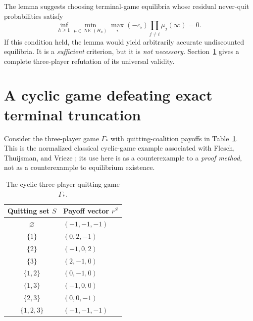 \documentclass[11pt,a4paper]{article}
\numberwithin{equation}{section}
\theoremstyle{plain}
\theoremstyle{definition}
\theoremstyle{remark}
\newcommand{\NE}{\operatorname{NE}}
\begin{document}
The lemma suggests choosing terminal-game equilibria whose residual
never-quit probabilities satisfy
\begin{equation}\label{eq:badcriterion}
 \inf_{h\ge1}\min_{\mu\in\NE(H_h)}
 \max_i(-c_i)\prod_{j\ne i}\mu_j(\infty)=0.
\end{equation}
If this condition held, the lemma would yield arbitrarily accurate
undiscounted equilibria. It is a \emph{sufficient} criterion, but it is
\emph{not necessary}. Section~\ref{sec:counterexample} gives a complete
three-player refutation of its universal validity.

\section{A cyclic game defeating exact terminal truncation}\label{sec:counterexample}
Consider the three-player game $\Gamma_*$ with quitting-coalition
payoffs in Table~\ref{tab:cyclic}. This is the normalized classical
cyclic-game example associated with Flesch, Thuijsman, and Vrieze
\cite{Flesch1997,AKRS2026}; its use here is as a counterexample to a
\emph{proof method}, not as a counterexample to equilibrium existence.
\begin{table}[htbp]
\centering
\caption{The cyclic three-player quitting game $\Gamma_*$.}
\label{tab:cyclic}
\begin{tabular}{@{}cl@{}}\toprule
Quitting set $S$ & Payoff vector $r^S$\\\midrule
$\varnothing$ & $(-1,-1,-1)$\\
$\{1\}$ & $(0,2,-1)$\\
$\{2\}$ & $(-1,0,2)$\\
$\{3\}$ & $(2,-1,0)$\\
$\{1,2\}$ & $(0,-1,0)$\\
$\{1,3\}$ & $(-1,0,0)$\\
$\{2,3\}$ & $(0,0,-1)$\\
$\{1,2,3\}$ & $(-1,-1,-1)$\\\bottomrule
\end{tabular}
\end{table}
\end{document}
